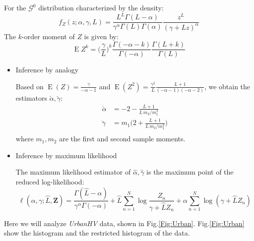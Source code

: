 \documentclass[conference,onecolumn]{IEEEtran}
\begin{document}
For the $\mathcal{G}^0$ distribution characterized by the density:
\begin{equation}
f_Z(z;\alpha,\gamma,L) = \frac{L^L \Gamma(L-\alpha)}{\gamma^\alpha \Gamma(L) \Gamma(\alpha)}
\frac{z^L}{(\gamma+Lz)^\alpha}
\end{equation}
The $k$-order moment of $Z$ is given by:
\begin{equation}
\operatorname{E}Z^k = \Big(\frac{\gamma}{L}\Big)^k
\frac{\Gamma(-\alpha-k)}{\Gamma(-\alpha)}
\frac{\Gamma(L+k)}{\Gamma(L)}
\label{eq:MomGI0}
\end{equation}
\begin{itemize}
	\item Inference by analogy
	
	Based on $\operatorname{E}(Z)= \frac{\gamma}{-\alpha-1}$ and $\operatorname{E}(Z^2)= \frac{\gamma^2}{L}\frac{L+1}{(-\alpha-1)(-\alpha-2)}$, we obtain the estimators $\breve{\alpha}, \breve{\gamma}$:
	\begin{equation}
	\begin{split}
	\breve{\alpha}	& = -2-\frac{L+1}{L\, m_2/m_1^2}\\
	\breve{\gamma}	& = m_1 \Big(2+\frac{L+1}{L\, m_2/m_1^2}\Big) \\
	\end{split}
	\end{equation}
	where $m_1, m_2$ are the first and second sample moments.
	
	\item Inference by maximum likelihood
	
	The maximum likelihood estimator of $\hat{\alpha}, \hat{\gamma}$ is the maximum point of the reduced log-likelihood:
	\begin{equation}
	\ell(\alpha,\gamma;\widehat L, \bm Z) = 
	\frac{\Gamma(\widehat L-\alpha)}{\gamma^\alpha \Gamma(-\alpha)} +
	\widehat L \sum_{n=1}^N \log\frac{Z_n}{\gamma+\widehat L Z_n} + 
	\alpha \sum_{n=1}^N \log(\gamma + \widehat L Z_n)
	\label{Eq:ReducedLogLikGI0}
	\end{equation}
\end{itemize}


Here we will analyze \textit{UrbanHV} data, shown in Fig.\ref{Fig:Urban}. Fig.\ref{Fig:Urban} show the histogram and the restricted histogram of the data. 
\end{document}
